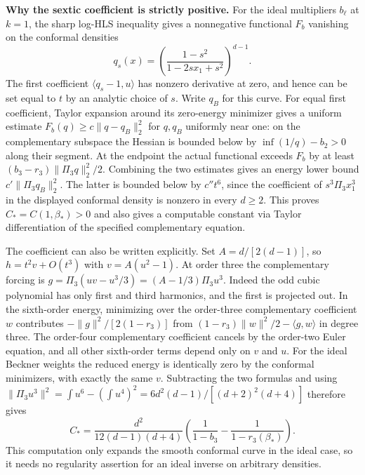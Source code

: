 \documentclass[10pt]{article}
\begin{document}
\textbf{Why the sextic coefficient is strictly positive.} For the ideal multipliers $b_\ell$ at $k=1$, the sharp log-HLS inequality gives a nonnegative functional $F_b$ vanishing on the conformal densities
\[
 q_s(x)=\left(\frac{1-s^2}{1-2s x_1+s^2}\right)^{d-1}.
\]
The first coefficient $\langle q_s-1,u\rangle$ has nonzero derivative at zero, and hence can be set equal to $t$ by an analytic choice of $s$. Write $q_B$ for this curve. For equal first coefficient, Taylor expansion around its zero-energy minimizer gives a uniform estimate $F_b(q)\ge c\|q-q_B\|_2^2$ for $q,q_B$ uniformly near one: on the complementary subspace the Hessian is bounded below by $\inf(1/q)-b_2>0$ along their segment. At the endpoint the actual functional exceeds $F_b$ by at least $(b_3-r_3)\|\Pi_3 q\|_2^2/2$. Combining the two estimates gives an energy lower bound $c'\|\Pi_3 q_B\|_2^2$. The latter is bounded below by $c''t^6$, since the coefficient of $s^3\Pi_3 x_1^3$ in the displayed conformal density is nonzero in every $d\ge2$. This proves $C_*=C(1,\beta_*)>0$ and also gives a computable constant via Taylor differentiation of the specified complementary equation.

The coefficient can also be written explicitly. Set $A=d/[2(d-1)]$, so $h=t^2v+O(t^3)$ with $v=A(u^2-1)$. At order three the complementary forcing is $g=\Pi_3(uv-u^3/3)=(A-1/3)\Pi_3u^3$. Indeed the odd cubic polynomial has only first and third harmonics, and the first is projected out. In the sixth-order energy, minimizing over the order-three complementary coefficient $w$ contributes $-\|g\|^2/[2(1-r_3)]$ from $(1-r_3)\|w\|^2/2-\langle g,w\rangle$ in degree three. The order-four complementary coefficient cancels by the order-two Euler equation, and all other sixth-order terms depend only on $v$ and $u$. For the ideal Beckner weights the reduced energy is identically zero by the conformal minimizers, with exactly the same $v$. Subtracting the two formulas and using $\|\Pi_3u^3\|^2=\int u^6-(\int u^4)^2=6d^2(d-1)/[(d+2)^2(d+4)]$ therefore gives
\[
 C_*=\frac{d^2}{12(d-1)(d+4)}\left(\frac1{1-b_3}-\frac1{1-r_3(\beta_*)}\right).
\]
This computation only expands the smooth conformal curve in the ideal case, so it needs no regularity assertion for an ideal inverse on arbitrary densities.
\end{document}
